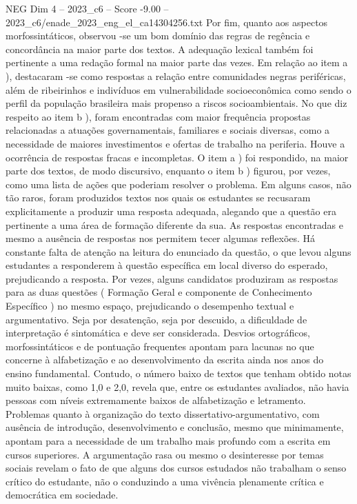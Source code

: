 \begin{textsample}{NEG Dim 4 – 2023\_c6 – Score -9.00 – 2023\_c6/enade\_2023\_eng\_el\_ca14304256.txt}
Por fim, quanto aos aspectos morfossintáticos, observou -se um bom domínio das regras de regência e concordância na maior parte dos textos.
A adequação lexical também foi pertinente a uma redação formal na maior parte das vezes.
Em relação ao item a ), destacaram -se como respostas a relação entre comunidades negras periféricas, além de ribeirinhos e indivíduos em vulnerabilidade socioeconômica como sendo o perfil da população brasileira mais propenso a riscos socioambientais.
No que diz respeito ao item b ), foram encontradas com maior frequência propostas relacionadas a atuações governamentais, familiares e sociais diversas, como a necessidade de maiores investimentos e ofertas de trabalho na periferia.
Houve a ocorrência de respostas fracas e incompletas.
O item a ) foi respondido, na maior parte dos textos, de modo discursivo, enquanto o item b ) figurou, por vezes, como uma lista de ações que poderiam resolver o problema.
Em alguns casos, não tão raros, foram produzidos textos nos quais os estudantes se recusaram explicitamente a produzir uma resposta adequada, alegando que a questão era pertinente a uma área de formação diferente da sua.
As respostas encontradas e mesmo a ausência de respostas nos permitem tecer algumas reflexões.
Há constante falta de atenção na leitura do enunciado da questão, o que levou alguns estudantes a responderem à questão específica em local diverso do esperado, prejudicando a resposta.
Por vezes, alguns candidatos produziram as respostas para as duas questões ( Formação Geral e componente de Conhecimento Específico ) no mesmo espaço, prejudicando o desempenho textual e argumentativo.
Seja por desatenção, seja por descuido, a dificuldade de interpretação é sintomática e deve ser considerada.
Desvios ortográficos, morfossintáticos e de pontuação frequentes apontam para lacunas no que concerne à alfabetização e ao desenvolvimento da escrita ainda nos anos do ensino fundamental.
Contudo, o número baixo de textos que tenham obtido notas muito baixas, como 1,0 e 2,0, revela que, entre os estudantes avaliados, não havia pessoas com níveis extremamente baixos de alfabetização e letramento.
Problemas quanto à organização do texto dissertativo-argumentativo, com ausência de introdução, desenvolvimento e conclusão, mesmo que minimamente, apontam para a necessidade de um trabalho mais profundo com a escrita em cursos superiores.
A argumentação rasa ou mesmo o desinteresse por temas sociais revelam o fato de que alguns dos cursos estudados não trabalham o senso crítico do estudante, não o conduzindo a uma vivência plenamente crítica e democrática em sociedade.

\end{textsample}
